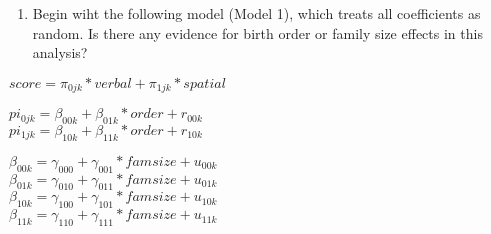 \documentclass[]{article}
\providecommand{\tightlist}{%
  \setlength{\itemsep}{0pt}\setlength{\parskip}{0pt}}
\begin{document}
\begin{enumerate}
\def\labelenumi{\arabic{enumi}.}
\setcounter{enumi}{1}
\tightlist
\item
  Begin wiht the following model (Model 1), which treats all
  coefficients as random. Is there any evidence for birth order or
  family size effects in this analysis?
\end{enumerate}

\(score = \pi_{0jk}*verbal + \pi_{1jk}*spatial\)

\(pi_{0jk} = \beta_{00k} + \beta_{01k}*order + r_{00k}\)\\
\(pi_{1jk} = \beta_{10k} + \beta_{11k}*order + r_{10k}\)

\(\beta_{00k} = \gamma_{000} + \gamma_{001}*famsize + u_{00k}\)\\
\(\beta_{01k} = \gamma_{010} + \gamma_{011}*famsize + u_{01k}\)\\
\(\beta_{10k} = \gamma_{100} + \gamma_{101}*famsize + u_{10k}\)\\
\(\beta_{11k} = \gamma_{110} + \gamma_{111}*famsize + u_{11k}\)
\end{document}
